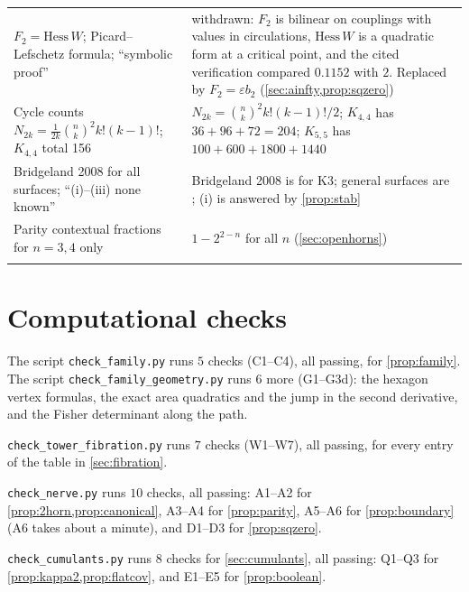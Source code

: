 \documentclass[11pt]{article}
\theoremstyle{definition}
\theoremstyle{remark}
\begin{document}
\begin{center}
\begin{tabular}{@{}R{0.36\textwidth}R{0.56\textwidth}@{}}
$F_2=\mathrm{Hess}\,W$; Picard--Lefschetz formula; ``symbolic proof'' & withdrawn: $F_2$ is bilinear on couplings
with values in circulations, $\mathrm{Hess}\,W$ is a quadratic form at a critical point, and the cited verification
compared $0.1152$ with $2$. Replaced by $F_2=\varepsilon b_2$ (\cref{sec:ainfty,prop:sqzero})\\\addlinespace[3pt]
Cycle counts $N_{2k}=\frac1{2k}\binom nk^2k!(k-1)!$; $K_{4,4}$ total 156 & $N_{2k}=\binom nk^2k!(k-1)!/2$; $K_{4,4}$ has
$36+96+72=204$; $K_{5,5}$ has $100+600+1800+1440$\\\addlinespace[3pt]
Bridgeland 2008 for all surfaces; ``(i)--(iii) none known'' & Bridgeland 2008 is for K3; general surfaces are
\cite{ArcaraBertram2013}; (i) is answered by \cref{prop:stab}\\\addlinespace[3pt]
Parity contextual fractions for $n=3,4$ only & $1-2^{2-n}$ for all $n$ (\cref{sec:openhorns})\\\addlinespace[3pt]
\bottomrule
\end{tabular}
\end{center}

\section{Computational checks}\label{app:code}

The script \texttt{check\_family.py} runs $5$ checks (C1--C4), all passing, for \cref{prop:family}. The script \texttt{check\_family\_geometry.py} runs $6$ more (G1--G3d): the hexagon vertex formulas, the exact area quadratics and the jump in the second derivative, and the Fisher determinant along the path.

\texttt{check\_tower\_fibration.py} runs $7$ checks (W1--W7), all passing, for every entry of the table in
\cref{sec:fibration}.

\texttt{check\_nerve.py} runs $10$ checks, all passing: A1--A2 for \cref{prop:2horn,prop:canonical}, A3--A4 for
\cref{prop:parity}, A5--A6 for \cref{prop:boundary} (A6 takes about a minute), and D1--D3 for
\cref{prop:sqzero}.

\texttt{check\_cumulants.py} runs $8$ checks for \cref{sec:cumulants}, all passing: Q1--Q3 for
\cref{prop:kappa2,prop:flatcov}, and E1--E5 for \cref{prop:boolean}.
\end{document}
